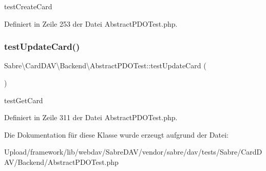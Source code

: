 test\+Create\+Card 

Definiert in Zeile 253 der Datei Abstract\+P\+D\+O\+Test.\+php.

\mbox{\label{class_sabre_1_1_card_d_a_v_1_1_backend_1_1_abstract_p_d_o_test_aacd2437dddbce6857203e647b8c11641}} 
\subsubsection{\texorpdfstring{test\+Update\+Card()}{testUpdateCard()}}
{\footnotesize\ttfamily Sabre\textbackslash{}\+Card\+D\+A\+V\textbackslash{}\+Backend\textbackslash{}\+Abstract\+P\+D\+O\+Test\+::test\+Update\+Card (\begin{DoxyParamCaption}{ }\end{DoxyParamCaption})}

test\+Get\+Card 

Definiert in Zeile 311 der Datei Abstract\+P\+D\+O\+Test.\+php.



Die Dokumentation für diese Klasse wurde erzeugt aufgrund der Datei\+:\begin{DoxyCompactItemize}
\item 
Upload/framework/lib/webdav/\+Sabre\+D\+A\+V/vendor/sabre/dav/tests/\+Sabre/\+Card\+D\+A\+V/\+Backend/Abstract\+P\+D\+O\+Test.\+php\end{DoxyCompactItemize}
